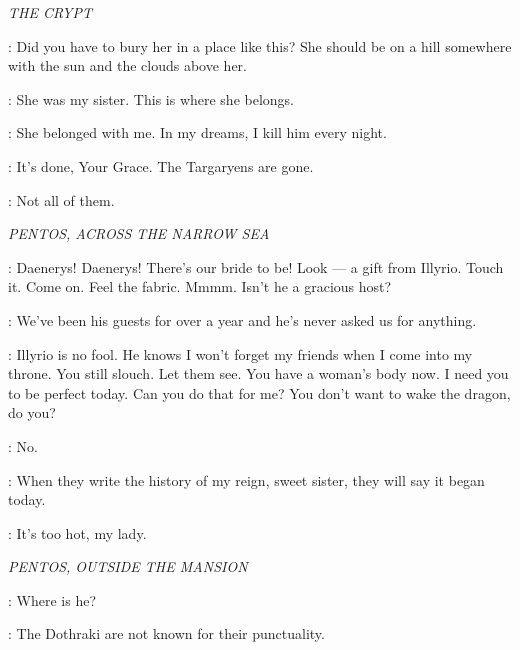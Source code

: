 \textit{THE CRYPT} 


\ROBERT: Did you have to bury her in a place like this? She should be on a hill somewhere with the sun and the clouds above her. 

\NED: She was my sister. This is where she belongs. 

\ROBERT: She belonged with me. In my dreams, I kill him every night. 

\NED: It's done, Your Grace. The Targaryens are gone. 

\ROBERT: Not all of them. 


\scene

\textit{PENTOS, ACROSS THE NARROW SEA} 


\VISERYS: Daenerys! Daenerys! There's our bride to be! Look --- a gift from Illyrio. Touch it. Come on. Feel the fabric. Mmmm. Isn't he a gracious host? 

\DAENERYS: We've been his guests for over a year and he's never asked us for anything. 

\VISERYS: Illyrio is no fool. He knows I won't forget my friends when I come into my throne. You still slouch. Let them see.  You have a woman's body now.  I need you to be perfect today. Can you do that for me? You don't want to wake the dragon, do you? 

\DAENERYS: No. 


\VISERYS: When they write the history of my reign, sweet sister, they will say it began today. 


\MAID: It's too hot, my lady. 


\scene

\textit{PENTOS, OUTSIDE THE MANSION} 


\VISERYS: Where is he? 

\ILLYRIO: The Dothraki are not known for their punctuality. 

